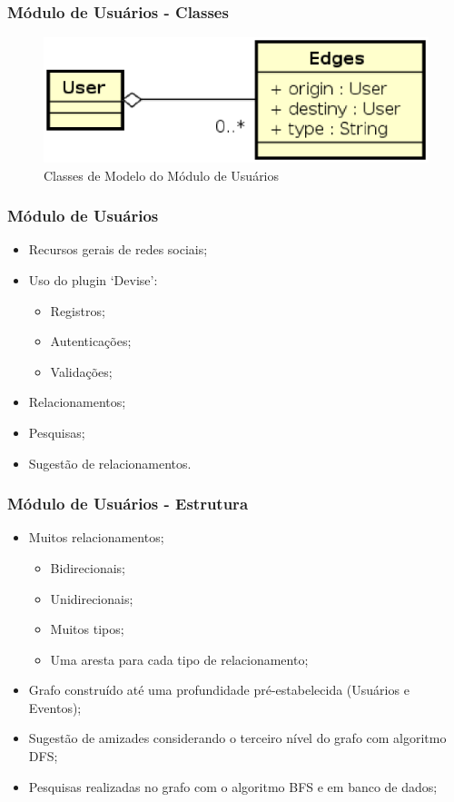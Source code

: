 \documentclass{beamer}
\begin{document}
\begin{frame}
\frametitle{Módulo de Usuários - Classes}

\begin{figure}[!h]
	\centering
	\includegraphics[scale=0.6]{figuras/modulo_usuarios.eps}
	\caption{Classes de Modelo do Módulo de Usuários}
\end{figure}

\end{frame}

\begin{frame}
\frametitle{Módulo de Usuários}

\begin{itemize}
	\item Recursos gerais de redes sociais;
	\item Uso do plugin `Devise':
	\begin{itemize}
		\item Registros;
		\item Autenticações;
		\item Validações;
	\end{itemize}
	\item Relacionamentos;
	\item Pesquisas;
	\item Sugestão de relacionamentos.
\end{itemize}

\end{frame}

\begin{frame}
\frametitle{Módulo de Usuários - Estrutura}

\begin{itemize}
	\item Muitos relacionamentos;
	\begin{itemize}
		\item Bidirecionais;
		\item Unidirecionais;
		\item Muitos tipos;
		\item Uma aresta para cada tipo de relacionamento;
	\end{itemize}
	\item Grafo construído até uma profundidade pré-estabelecida (Usuários e Eventos);
	\item Sugestão de amizades considerando o terceiro nível do grafo com algoritmo DFS;
	\item Pesquisas realizadas no grafo com o algoritmo BFS e em banco de dados;
\end{itemize}

\end{frame}
\end{document}
